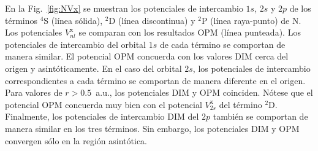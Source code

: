 En la Fig.~\ref{fig:NVx} se muestran los potenciales de intercambio 
$1s$, $2s$ y $2p$ de los términos $^4$S (línea sólida), $^2$D (línea 
discontinua) y $^2$P (línea raya-punto) de N. Los potenciales 
$V_{nl}^{\mathrm{x}}$ se comparan con los resultados OPM (línea 
punteada). Los potenciales de intercambio del orbital $1s$ de cada 
término se comportan de manera similar. El potencial OPM concuerda con 
los valores DIM cerca del origen y asintóticamente. En el caso del 
orbital $2s$, los potenciales de intercambio correspondientes a cada 
término se comportan de manera diferente en el origen. Para valores de 
$r>0.5$~a.u., los potenciales DIM y OPM coinciden. Nótese que el 
potencial OPM concuerda muy bien con el potencial $V_{2s}^{\mathrm{x}}$ 
del término $^2$D. Finalmente, los potenciales de intercambio DIM del 
$2p$ también se comportan de manera similar en los tres términos. Sin 
embargo, los potenciales DIM y OPM convergen sólo en la región 
asintótica. 

